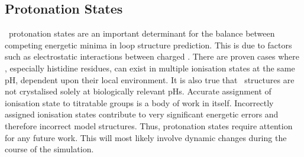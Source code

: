 \subsection{Protonation States}

\Sidechain\ protonation states are an important determinant for the balance between competing energetic minima in loop structure prediction. This is due to factors such as electrostatic interactions between charged \sidechains. There are proven cases where \sidechains, especially histidine residues, can exist in multiple ionisation states at the same pH, dependent upon their local environment. It is also true that \xray\ structures are not crystalised solely at biologically relevant pHs. Accurate assignment of ionisation state to titratable groups is a body of work in itself. Incorrectly assigned ionisation states contribute to very significant energetic errors and therefore incorrect model structures.
Thus, protonation states
require attention for any future work. This will most likely involve dynamic changes during the course of the simulation. 








